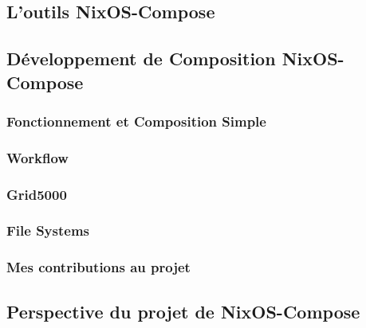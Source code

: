 \documentclass[a4paper,french,12pt, titlepage]{article}
\begin{document}
\newpage

\hypertarget{loutils-nixos-compose}{%
\subsection{L'outils NixOS-Compose}\label{loutils-nixos-compose}}

\newpage

\hypertarget{duxe9veloppement-de-composition-nixos-compose}{%
\subsection{Développement de Composition
NixOS-Compose}\label{duxe9veloppement-de-composition-nixos-compose}}

\hypertarget{fonctionnement-et-composition-simple}{%
\subsubsection{Fonctionnement et Composition
Simple}\label{fonctionnement-et-composition-simple}}

\hypertarget{workflow}{%
\subsubsection{Workflow}\label{workflow}}

\hypertarget{grid5000}{%
\subsubsection{Grid5000}\label{grid5000}}

\hypertarget{file-systems}{%
\subsubsection{File Systems}\label{file-systems}}

\hypertarget{mes-contributions-au-projet}{%
\subsubsection{Mes contributions au
projet}\label{mes-contributions-au-projet}}

\newpage

\hypertarget{perspective-du-projet-de-nixos-compose}{%
\subsection{Perspective du projet de
NixOS-Compose}\label{perspective-du-projet-de-nixos-compose}}
\end{document}

